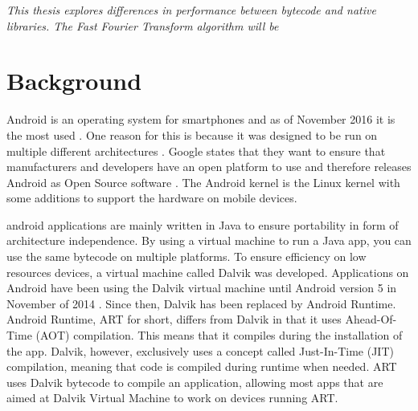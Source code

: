 
\textit{This thesis explores differences in performance between bytecode and native libraries. The Fast Fourier Transform algorithm will be }


\section{Background}
Android is an operating system for smartphones and as of November 2016 it is the most used \cite{android:os:popularity}. One reason for this is because it was designed to be run on multiple different architectures \cite{android:os:devices}. Google states that they want to ensure that manufacturers and developers have an open platform to use and therefore releases Android as Open Source software \cite{android:os:opensource}. The Android kernel is the Linux kernel with some additions to support the hardware on mobile devices.


\gls{android} applications are mainly written in Java to ensure portability in form of architecture independence. By using a virtual machine to run a Java app, you can use the same bytecode on multiple platforms. To ensure efficiency on low resources devices, a virtual machine called Dalvik was developed. Applications on Android have been using the Dalvik virtual machine until Android version 5 \cite{android:dalvik} in November of 2014 \cite{android:dalvik:release}. Since then, Dalvik has been replaced by Android Runtime. Android Runtime, ART for short, differs from Dalvik in that it uses Ahead-Of-Time (AOT) compilation. This means that it compiles during the installation of the app. Dalvik, however, exclusively uses a concept called Just-In-Time (JIT) compilation, meaning that code is compiled during runtime when needed. ART uses Dalvik bytecode to compile an application, allowing most apps that are aimed at Dalvik Virtual Machine to work on devices running ART.

